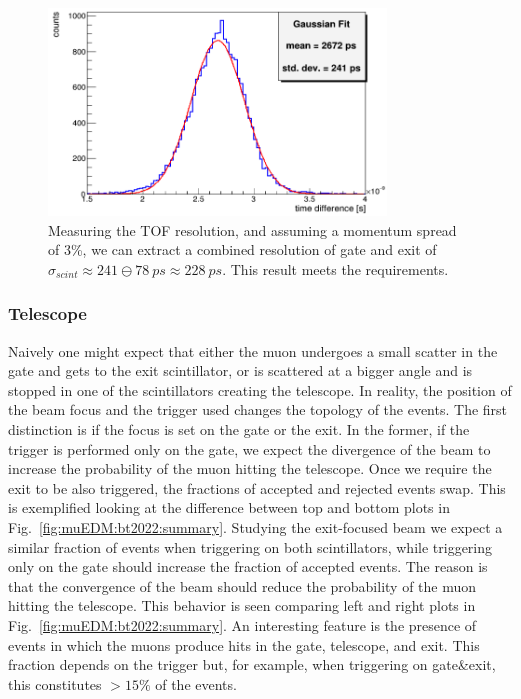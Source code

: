 \begin{refsection}
            \begin{figure}
                \centering
                \includegraphics[width = 0.8\textwidth]{Figures/muEDM_Nov2022/gate_resolution.png}
                \caption[muEDM 2022: gate-exit time resolution]{Measuring the TOF resolution, and assuming a momentum spread of 3\%, we can extract a combined resolution of gate and exit of $\sigma_{scint}\approx 241 \ominus \SI{78}{ps} \approx \SI{228}{ps}$. This result meets the requirements.}
                \label{fig:muEDM:bt20212gate:resolution}
            \end{figure}

        \subsubsection{Telescope}
            \noindent
            Naively one might expect that either the muon undergoes a small scatter in the gate and gets to the exit scintillator, or is scattered at a bigger angle and is stopped in one of the scintillators creating the telescope.
            In reality, the position of the beam focus and the trigger used changes the topology of the events.
            The first distinction is if the focus is set on the gate or the exit.
            In the former, if the trigger is performed only on the gate, we expect the divergence of the beam to increase the probability of the muon hitting the telescope.
            Once we require the exit to be also triggered, the fractions of accepted and rejected events swap. 
            This is exemplified looking at the difference between top and bottom plots in Fig.~\ref{fig:muEDM:bt2022:summary}.
            Studying the exit-focused beam we expect a similar fraction of events when triggering on both scintillators, while triggering only on the gate should increase the fraction of accepted events.
            The reason is that the convergence of the beam should reduce the probability of the muon hitting the telescope.
            This behavior is seen comparing left and right plots in Fig.~\ref{fig:muEDM:bt2022:summary}.
            An interesting feature is the presence of events in which the muons produce hits in the gate, telescope, and exit. 
            This fraction depends on the trigger but, for example, when triggering on gate\&exit, this constitutes $>15\%$ of the events.\\


\end{refsection}
